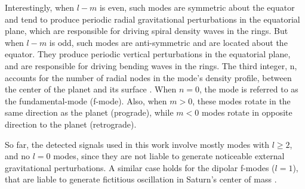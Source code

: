 \documentclass{article}
\begin{document}
Interestingly, when $l-m$ is even, such modes are symmetric about the equator and tend to produce periodic radial gravitational perturbations in the equatorial plane, which are responsible for driving spiral density waves in the rings. But when $l-m$ is odd, such modes are anti-symmetric and are located about the equator. They produce periodic vertical perturbations in the equatorial plane, and are responsible for driving bending waves in the rings. The third integer, n, accounts for the number of radial nodes in the mode's density profile, between the center of the planet and its surface \cite{FRENCH2021114660}. When $n=0$, the mode is referred to as the fundamental-mode (f-mode). Also, when $m>0$, these modes rotate in the same direction as the planet (prograde), while $m<0$ modes rotate in opposite direction to the planet (retrograde). 

So far, the detected signals used in this work involve mostly modes with $l\geq 2$, and no $l=0$ modes, since they are not liable to generate noticeable external gravitational perturbations. A similar case holds for the dipolar f-modes ($l=1$), that are liable to generate fictitious oscillation in Saturn's center of mass \cite{FRENCH2021114660}.
\end{document}
